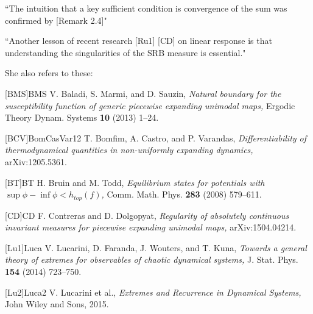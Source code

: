 \begin{description}
``The intuition that a key sufficient condition is convergence of the sum
was confirmed by  [Remark 2.4]"

``Another lesson of recent research [Ru1] 
[CD] on linear response is that understanding the singularities of the
SRB measure is essential."

She also refers to these:


 [BMS]{BMS} V. Baladi, S. Marmi, and D. Sauzin,
 {\it Natural boundary for the susceptibility function of generic
piecewise expanding unimodal maps,}
Ergodic Theory Dynam. Systems \textbf{10}
(2013) 1--24.


[BCV]{BomCasVar12} T. Bomfim, A. Castro, and P. Varandas,
\emph{Differentiability of thermodynamical quantities in
      non\--uni\-formly expanding dynamics,}
arXiv:1205.5361.

 [BT]{BT} H. Bruin and M. Todd,
 {\it Equilibrium states for potentials with
   $\sup \phi -\inf \phi < h_{top}(f)$,} Comm. Math. Phys.
 {\bf 283} (2008) 579--611.

 [CD]{CD} F. Contreras and D. Dolgopyat, {\it Regularity of absolutely
 continuous invariant measures for piecewise expanding unimodal maps,}
 arXiv:1504.04214.


%
%


[Lu1]{Luca} V. Lucarini, D. Faranda, J. Wouters, and T. Kuna, {\it
Towards a general theory of extremes for observables of chaotic
dynamical systems,}
 J. Stat. Phys. {\bf 154} (2014) 723--750.

[Lu2]{Luca2} V. Lucarini et al., {\it Extremes and Recurrence in
Dynamical Systems,}
 John Wiley and Sons, 2015.



\end{description}
